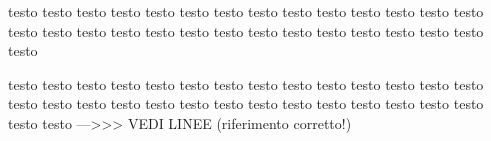 \documentclass[10pt,a4paper,twoside]{memoir}
\newcounter{Atest}
\newcounter{Btest}
\newcounter{Ctest}
\begin{document}
\begin{pages}
\begin{Leftside}
\setcounter{Atest}{0}
\setcounter{Btest}{0}
\setcounter{Ctest}{0}
\beginnumbering
\setlength\parindent{0pt}%

    \pstart\relax
    testo testo testo testo testo testo testo testo testo testo testo testo testo testo testo testo testo testo testo testo testo testo testo testo testo testo testo testo testo 
    \pend
    \endnumbering
\end{Leftside}

\begin{Rightside}
    \setlength\parindent{0pt}
    \beginnumbering
    \pstart\relax 
    testo testo testo testo testo testo testo testo testo testo testo testo testo testo testo testo testo testo testo testo testo testo testo testo testo testo testo testo testo testo --->>> VEDI LINEE   (riferimento corretto!)
    \pend
    \endnumbering
\end{Rightside} 
\end{pages} 
\Pages
{}
\makeatletter
\end{document}
